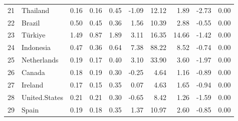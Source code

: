 \documentclass[12pt,a4paper]{article}
\begin{document}
\begin{table}[ht]
\begin{tabular}{rlrrrrrrrr}
      21 & Thailand & 0.16 & 0.16 & 0.45 & -1.09 & 12.12 & 1.89 & -2.73 & 0.00 \\ 
      22 & Brazil & 0.50 & 0.45 & 0.36 & 1.56 & 10.39 & 2.88 & -0.55 & 0.00 \\ 
      23 & Türkiye & 1.49 & 0.87 & 1.89 & 3.11 & 16.35 & 14.66 & -1.42 & 0.00 \\ 
      24 & Indonesia & 0.47 & 0.36 & 0.64 & 7.38 & 88.22 & 8.52 & -0.74 & 0.00 \\ 
      25 & Netherlands & 0.19 & 0.17 & 0.40 & 3.10 & 33.90 & 3.60 & -1.97 & 0.00 \\ 
      26 & Canada & 0.18 & 0.19 & 0.30 & -0.25 & 4.64 & 1.16 & -0.89 & 0.00 \\ 
      27 & Ireland & 0.17 & 0.15 & 0.35 & 0.07 & 4.63 & 1.65 & -0.94 & 0.00 \\ 
      28 & United.States & 0.21 & 0.21 & 0.30 & -0.65 & 8.42 & 1.26 & -1.59 & 0.00 \\ 
      29 & Spain & 0.19 & 0.18 & 0.35 & 1.37 & 10.97 & 2.60 & -0.85 & 0.00 \\ 
       \hline
    \end{tabular}
    \end{table}

\newpage
\printbibliography
\end{document}
